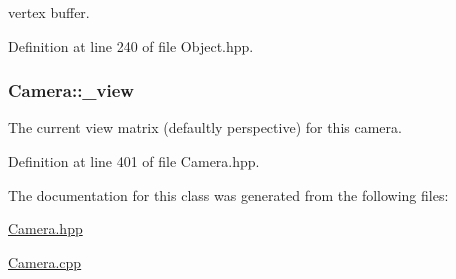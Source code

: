 vertex buffer. 



Definition at line 240 of file Object.\-hpp.

\hypertarget{class_camera_a28f6e710df6db726568cd0f2bbd3643a}{
\subsubsection[{\-\_\-view}]{ Camera\-::\-\_\-view\hspace{0.3cm}{\ttfamily [private]}}}\label{class_camera_a28f6e710df6db726568cd0f2bbd3643a}


The current view matrix (defaultly perspective) for this camera. 



Definition at line 401 of file Camera.\-hpp.



The documentation for this class was generated from the following files\-:\begin{DoxyCompactItemize}
\item 
\hyperlink{_camera_8hpp}{Camera.\-hpp}\item 
\hyperlink{_camera_8cpp}{Camera.\-cpp}\end{DoxyCompactItemize}
